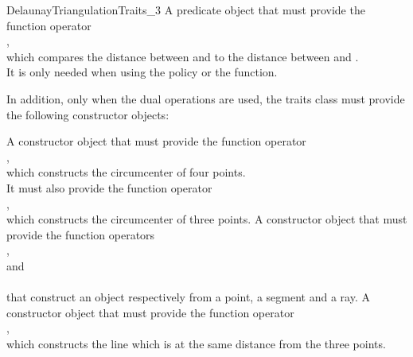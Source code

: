 \begin{ccRefConcept}{DelaunayTriangulationTraits_3}
{A predicate object that must provide the function operator\\
,\\
which compares the distance between  and  to the distance
between  and .\\
It is only needed when using the  policy or the
 function.}

In addition, only when the dual operations are used, the traits class
must provide the following constructor objects: 

{A constructor object that must provide the function operator\\
,\\
which constructs the circumcenter of four points.
\\
It must also provide the function operator\\
,\\
which constructs the circumcenter of three points.
}
\ccGlue
{}
{A constructor object that must provide the function operators\\
,\\
 and\\
\\
that construct an object respectively from a point, a segment and a ray.}
\ccGlue
{}
{A constructor object that must provide the function operator\\
,\\
which constructs the line which is at the same distance from the three points.
}
\ccGlue

\end{ccRefConcept}

